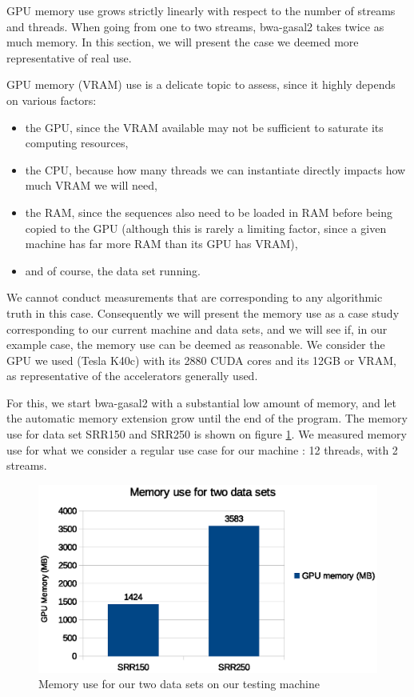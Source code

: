 GPU memory use grows strictly linearly with respect to the number of streams and threads. When going from one to two streams, bwa-gasal2 takes twice as much memory. In this section, we will present the case we deemed more representative of real use.

GPU memory (VRAM) use is a delicate topic to assess, since it highly depends on various factors:

\begin{itemize}
	\item the GPU, since the VRAM available may not be sufficient to saturate its computing resources,
	\item the CPU, because how many threads we can instantiate directly impacts how much VRAM we will need,
	\item the RAM, since the sequences also need to be loaded in RAM before being copied to the GPU (although this is rarely a limiting factor, since a given machine has far more RAM than its GPU has VRAM),
	\item and of course, the data set running.
\end{itemize}

We cannot conduct measurements that are corresponding to any algorithmic truth in this case. Consequently we will present the memory use as a case study corresponding to our current machine and data sets, and we will see if, in our example case, the memory use can be deemed as reasonable. We consider the GPU we used (Tesla K40c) with its 2880 CUDA cores and its 12GB or VRAM, as representative of the accelerators generally used.

For this, we start bwa-gasal2 with a substantial low amount of memory, and let the automatic memory extension grow until the end of the program. The memory use for data set SRR150 and SRR250 is shown on figure \ref{fig:memory-use}. We measured memory use for what we consider a regular use case for our machine : 12 threads, with 2 streams. 

\begin{figure}[h]
	\centering
	\includegraphics[width=0.9\linewidth]{memory-use}
	\caption{Memory use for our two data sets on our testing machine}
	\label{fig:memory-use}
\end{figure}

